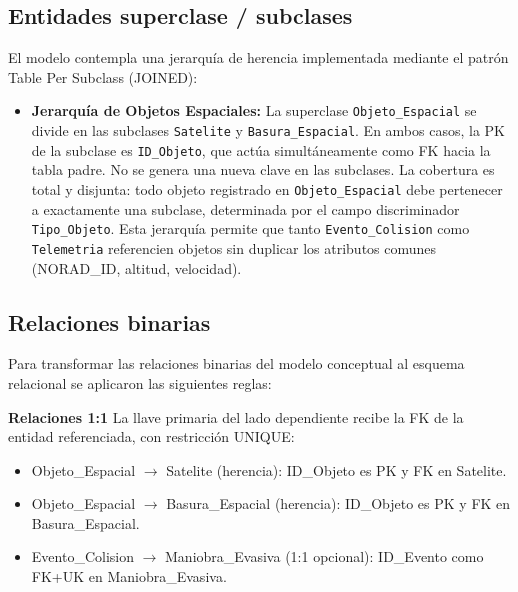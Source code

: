 \subsection{Entidades superclase / subclases}

El modelo contempla una jerarquía de herencia implementada mediante el patrón Table Per Subclass (JOINED):

\begin{itemize}
    \item \textbf{Jerarquía de Objetos Espaciales:} La superclase \texttt{Objeto\_Espacial} se divide en las subclases \texttt{Satelite} y \texttt{Basura\_Espacial}. En ambos casos, la PK de la subclase es \texttt{ID\_Objeto}, que actúa simultáneamente como FK hacia la tabla padre. No se genera una nueva clave en las subclases. La cobertura es total y disjunta: todo objeto registrado en \texttt{Objeto\_Espacial} debe pertenecer a exactamente una subclase, determinada por el campo discriminador \texttt{Tipo\_Objeto}. Esta jerarquía permite que tanto \texttt{Evento\_Colision} como \texttt{Telemetria} referencien objetos sin duplicar los atributos comunes (NORAD\_ID, altitud, velocidad).
\end{itemize}

\subsection{Relaciones binarias}

Para transformar las relaciones binarias del modelo conceptual al esquema relacional se aplicaron las siguientes reglas:

\textbf{Relaciones 1:1} La llave primaria del lado dependiente recibe la FK de la entidad referenciada, con restricción UNIQUE:
\begin{itemize}
    \item Objeto\_Espacial $\rightarrow$ Satelite (herencia): ID\_Objeto es PK y FK en Satelite.
    \item Objeto\_Espacial $\rightarrow$ Basura\_Espacial (herencia): ID\_Objeto es PK y FK en Basura\_Espacial.
    \item Evento\_Colision $\rightarrow$ Maniobra\_Evasiva (1:1 opcional): ID\_Evento como FK+UK en Maniobra\_Evasiva.
\end{itemize}

